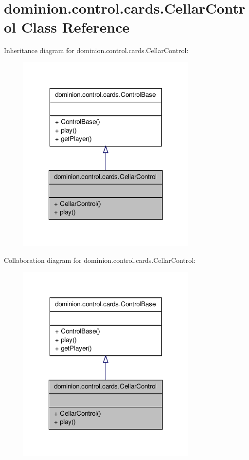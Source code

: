 \hypertarget{classdominion_1_1control_1_1cards_1_1CellarControl}{\section{dominion.\-control.\-cards.\-Cellar\-Control \-Class \-Reference}
\label{classdominion_1_1control_1_1cards_1_1CellarControl}
}


\-Inheritance diagram for dominion.\-control.\-cards.\-Cellar\-Control\-:
\nopagebreak
\begin{figure}[H]
\begin{center}
\leavevmode
\includegraphics[width=254pt]{classdominion_1_1control_1_1cards_1_1CellarControl__inherit__graph}
\end{center}
\end{figure}


\-Collaboration diagram for dominion.\-control.\-cards.\-Cellar\-Control\-:
\nopagebreak
\begin{figure}[H]
\begin{center}
\leavevmode
\includegraphics[width=254pt]{classdominion_1_1control_1_1cards_1_1CellarControl__coll__graph}
\end{center}
\end{figure}
